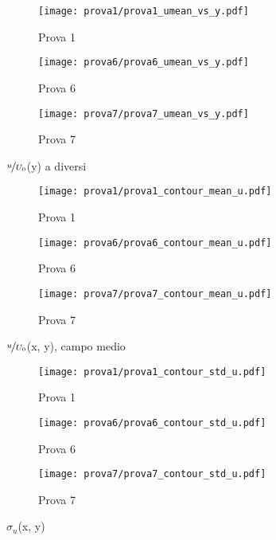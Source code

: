 \documentclass{article} %
\newcommand{\xd}{\nicefrac{\textrm{x}}{\textrm{D}}\ }
\begin{document}
\begin{figure}[b!]
	\centering
	\begin{subfigure}{0.3\textwidth}
		\texttt{[image: prova1/prova1\_umean\_vs\_y.pdf]}
		\label{fig:y_Unorm_1}
		\caption{Prova 1}
	\end{subfigure}
	\begin{subfigure}{0.3\textwidth}
		\texttt{[image: prova6/prova6\_umean\_vs\_y.pdf]}
		\label{fig:y_Unorm_2}
		\caption{Prova 6}
	\end{subfigure}  
	\begin{subfigure}{0.3\textwidth}
		\texttt{[image: prova7/prova7\_umean\_vs\_y.pdf]}
		\label{fig:y_Unorm_3}
		\caption{Prova 7}
	\end{subfigure}  
	\caption{$\nicefrac{u}{U_0}$(y) a diversi \xd}
      \label{fig:y_Unorm_167}
\end{figure}
\clearpage
\begin{figure}[h!]
	\centering
	\begin{subfigure}{0.3\textwidth}
		\texttt{[image: prova1/prova1\_contour\_mean\_u.pdf]}
		\label{fig:MEAN_U_1}
		\caption{Prova 1}
	\end{subfigure} 
	\begin{subfigure}{0.3\textwidth}
		\texttt{[image: prova6/prova6\_contour\_mean\_u.pdf]}
		\label{fig:MEAN_U_2}
		\caption{Prova 6}
	\end{subfigure}  
	\begin{subfigure}{0.3\textwidth}
		\texttt{[image: prova7/prova7\_contour\_mean\_u.pdf]}
		\label{fig:MEAN_U_3}
		\caption{Prova 7}
	\end{subfigure}  
	\caption{$\nicefrac{u}{U_0}$(x, y), campo medio}
	\label{fig:MEAN_U_167}
\end{figure}
\begin{figure}[h!]
	\centering
	\begin{subfigure}{0.3\textwidth}
		\texttt{[image: prova1/prova1\_contour\_std\_u.pdf]}
		\caption{Prova 1}
		\label{fig:STD_U_1}
	\end{subfigure} 
	\begin{subfigure}{0.3\textwidth}
		\texttt{[image: prova6/prova6\_contour\_std\_u.pdf]}
		\caption{Prova 6}
		\label{fig:STD_U_2}
	\end{subfigure}  
	\begin{subfigure}{0.3\textwidth}
		\texttt{[image: prova7/prova7\_contour\_std\_u.pdf]}
		\caption{Prova 7}
		\label{fig:STD_U_3}
	\end{subfigure}
      \caption{$\sigma_u$(x, y)}
      \label{fig:STD_U_167}
\end{figure}
\clearpage
\end{document}
